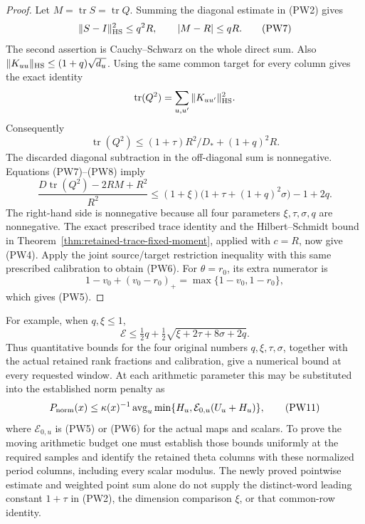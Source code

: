 \begin{proof}
Let \(M=\operatorname{tr}S=\operatorname{tr}Q\).  Summing
the diagonal estimate in (PW2) gives
\[
 \|S-I\|_{\rm HS}^2\le q^2R,
       \qquad |M-R|\le qR.                             \tag{PW7}
\]
The second assertion is Cauchy--Schwarz on the whole direct
sum.  Also
\(\|K_{uu}\|_{\rm HS}\le(1+q)\sqrt{d_u}\).
Using the same common target for every column gives the exact
identity
\[
 \operatorname{tr}(Q^2)=\sum_{u,u'}\|K_{uu'}\|_{\rm HS}^2.
\]
Consequently
\[
 \operatorname{tr}(Q^2)
       \le(1+\tau)R^2/D_*+(1+q)^2R.                    \tag{PW8}
\]
The discarded diagonal subtraction in the off-diagonal sum
is nonnegative.  Equations (PW7)--(PW8) imply
\[
 \frac{D\operatorname{tr}(Q^2)-2RM+R^2}{R^2}
 \le(1+\xi)\bigl(1+\tau+(1+q)^2\sigma\bigr)-1+2q.
                                                        \tag{PW9}
\]
The right-hand side is nonnegative because all four parameters
\(\xi,\tau,\sigma,q\) are nonnegative.  The exact prescribed
trace identity and the Hilbert--Schmidt bound in
Theorem~\ref{thm:retained-trace-fixed-moment}, applied with
\(c=R\), now give (PW4).  Apply the joint source/target
restriction inequality with this same prescribed calibration
to obtain (PW6).  For \(\theta=r_0\), its extra numerator is
\[
       1-v_0+(v_0-r_0)_+=\max\{1-v_0,1-r_0\},
\]
which gives (PW5).
\end{proof}

For example, when \(q,\xi\le1\),
\[
 \mathcal E\le\tfrac12q+
                  \tfrac12\sqrt{\xi+2\tau+8\sigma+2q}.
                                                        \tag{PW10}
\]
Thus quantitative bounds for the four original numbers
\(q,\xi,\tau,\sigma\), together with the actual retained
rank fractions and calibration, give a numerical bound at
every requested window.  At each arithmetic parameter this
may be substituted into the established norm penalty as
\[
 P_{\rm norm}(x)\le\kappa(x)^{-1}
       \operatorname{avg}_u
           \min\{H_u,\mathcal E_{0,u}(U_u+H_u)\},        \tag{PW11}
\]
where \(\mathcal E_{0,u}\) is (PW5) or (PW6) for the actual
maps and scalars.  To prove the moving arithmetic budget one
must establish those bounds uniformly at the required samples
and identify the retained theta columns with these normalized
period columns, including every scalar modulus.  The newly
proved pointwise estimate and weighted point sum alone do not
supply the distinct-word leading constant \(1+\tau\) in (PW2),
the dimension comparison \(\xi\), or that common-row identity.
